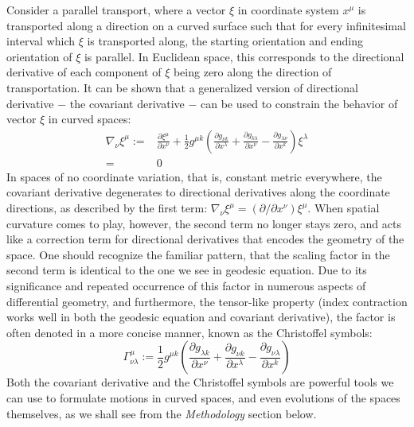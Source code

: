 \documentclass[conference]{IEEEtran}
\begin{document}
Consider a parallel transport, where a vector $\xi$ in coordinate system $x^\mu$ is transported 
along a direction on a curved surface such that for 
every infinitesimal interval which $\xi$ is transported along, 
the starting orientation and ending orientation of $\xi$ is 
parallel. In Euclidean space, this corresponds to the 
directional derivative of each component of $\xi$ being zero 
along the direction of transportation. It can be shown \cite{SemiR} 
that a generalized version of directional 
derivative $-$ the covariant derivative $-$ can be used to 
constrain the behavior of vector $\xi$ in curved spaces:
\begin{align*}
\nabla_\nu \xi^\mu :=& \frac{\partial \xi^\mu}{\partial x^\nu} + \frac{1}{2} 
g^{\mu k}\left(\frac{\partial g_{\nu k}}{\partial x^\lambda} + 
\frac{\partial g_{k \lambda}}{\partial x^\nu} - 
\frac{\partial g_{\lambda\nu}}{\partial x^k}\right) \xi^\lambda   \tag{5} \\
=& 0
\end{align*}
In spaces of no coordinate variation, that is, constant 
metric everywhere, the covariant derivative degenerates 
to directional derivatives along the coordinate 
directions, as described by the first term: $\nabla_\nu \xi^\mu=(\partial/\partial x^{\nu}) \xi^\mu$. 
When spatial curvature comes to play, however, 
the second term no longer stays zero, and acts 
like a correction term for directional derivatives 
that encodes the geometry of the space. One should recognize 
the familiar pattern, that the scaling factor 
in the second term is identical to the one 
we see in geodesic equation. Due to its significance and 
repeated occurrence of this factor in numerous aspects of 
differential geometry, and furthermore, 
the tensor-like property (index contraction works well in 
both the geodesic equation and covariant derivative), 
the factor is often denoted in a more concise manner, known as the 
Christoffel symbols:
\[
\Gamma_{\nu\lambda}^\mu := \frac{1}{2} 
g^{\mu k}\left(\frac{\partial g_{\lambda k}}{\partial x^\nu} + 
\frac{\partial g_{\nu k}}{\partial x^\lambda} - 
\frac{\partial g_{\nu\lambda}}{\partial x^k}\right)
\]
Both the covariant derivative and the Christoffel symbols are 
powerful tools we can use to formulate motions in curved spaces, and even 
evolutions of the spaces themselves, as we shall see from the \textit{Methodology} 
section below.
\end{document}
